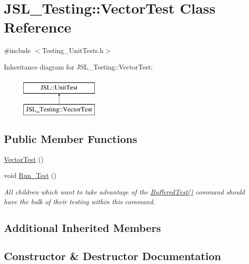 \hypertarget{classJSL__Testing_1_1VectorTest}{}\section{J\+S\+L\+\_\+\+Testing\+:\+:Vector\+Test Class Reference}
\label{classJSL__Testing_1_1VectorTest}


{\ttfamily \#include $<$Testing\+\_\+\+Unit\+Tests.\+h$>$}

Inheritance diagram for J\+S\+L\+\_\+\+Testing\+:\+:Vector\+Test\+:\begin{figure}[H]
\begin{center}
\leavevmode
\includegraphics[height=2.000000cm]{classJSL__Testing_1_1VectorTest}
\end{center}
\end{figure}
\subsection*{Public Member Functions}
\begin{DoxyCompactItemize}
\item 
\hyperlink{classJSL__Testing_1_1VectorTest_a4750f287bc10a0df1f4f28cb84598bc2}{Vector\+Test} ()
\item 
void \hyperlink{classJSL__Testing_1_1VectorTest_ad79bb4654e6f7b59d31d7239ee0c2b82}{Run\+\_\+\+Test} ()
\begin{DoxyCompactList}\small\item\em All children which want to take advantage of the \hyperlink{classJSL_1_1UnitTest_aabec19b081be8a428f12e4b5e3dc2a9c}{Buffered\+Test()} command should have the bulk of their testing within this command. \end{DoxyCompactList}\end{DoxyCompactItemize}
\subsection*{Additional Inherited Members}


\subsection{Constructor \& Destructor Documentation}
\mbox{\label{classJSL__Testing_1_1VectorTest_a4750f287bc10a0df1f4f28cb84598bc2}} 
